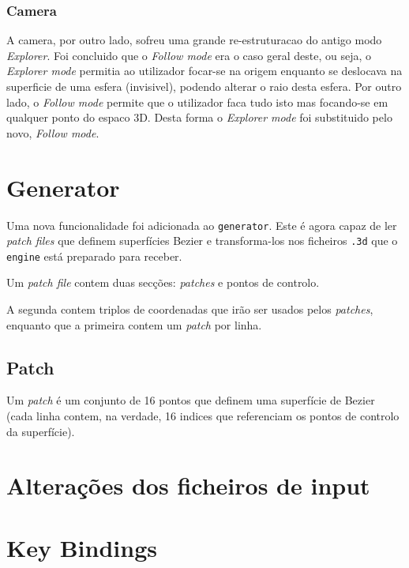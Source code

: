 \documentclass[a4paper]{article}
\begin{document}
\subsubsection{Camera}

A camera, por outro lado, sofreu uma grande re-estruturacao do antigo modo \textit{Explorer}.
Foi concluido que o \textit{Follow mode} era o caso geral deste, ou seja, o \textit{Explorer mode}
permitia ao utilizador focar-se na origem enquanto se deslocava na superficie de uma esfera (invisivel), podendo alterar o raio desta esfera. Por outro lado, o \textit{Follow mode} permite
que o utilizador faca tudo isto mas focando-se em qualquer ponto do espaco 3D. Desta forma o \textit{Explorer mode} foi substituido pelo novo, \textit{Follow mode}.

\section{Generator}

Uma nova funcionalidade foi adicionada ao \texttt{generator}. Este é agora capaz de ler \textit{patch files} que definem superfícies Bezier e transforma-los nos ficheiros \texttt{.3d} que o \texttt{engine} está preparado para receber.

Um \textit{patch file} contem duas secções: \textit{patches} e pontos de controlo.

A segunda contem triplos de coordenadas que irão ser usados pelos \textit{patches}, enquanto que a primeira contem um \textit{patch} por linha.

\subsection{Patch}

Um \textit{patch} é um conjunto de 16 pontos que definem uma superfície de Bezier (cada linha contem, na verdade, 16 indices que referenciam os pontos de controlo da superfície).

\section{Alterações dos ficheiros de input}\label{sec:estrutura-ficheiros}


\section{Key Bindings}

\end{document}
